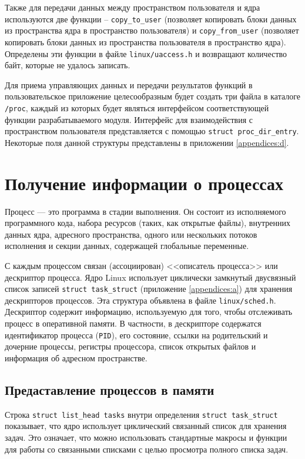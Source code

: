 Также для передачи данных между пространством пользователя и ядра используются две функции -- \texttt{copy\_to\_user} (позволяет копировать блоки данных из пространства ядра в пространство пользователя) и \texttt{copy\_from\_user} (позволяет копировать блоки данных из пространства пользователя в пространство ядра). Определены эти функции в файле \texttt{linux/uaccess.h} и возвращают количество байт, которые не удалось записать.

Для приема управляющих данных и передачи результатов функций в пользовательское приложение целесообразным будет создать три файла в каталоге \texttt{/proc}, каждый из которых будет являться интерфейсом соответствующей функции разрабатываемого модуля. Интерфейс для взаимодействия с пространством пользователя представляется с помощью \texttt{struct proc\_dir\_entry}. Некоторые поля данной структуры представлены в приложении \ref{appendices:d}. 


\section{Получение информации о процессах}

Процесс --- это программа в стадии выполнения. Он состоит из исполняемого программного кода, набора ресурсов (таких, как открытые файлы), внутренних данных ядра, адресного пространства, одного или нескольких потоков исполнения и секции данных, содержащей глобальные переменные. 

С каждым процессом связан (ассоциирован) <<описатель процесса>> или дескриптор процесса. Ядро Linux использует циклически замкнутый двусвязный список записей \texttt{struct task\_struct} (приложение \ref{appendices:a}) для хранения дескрипторов процессов. Эта структура объявлена в файле \texttt{linux/sched.h}. Дескриптор содержит информацию, используемую для того, чтобы отслеживать процесс в оперативной памяти. В частности, в дескрипторе содержатся идентификатор процесса (\texttt{PID}), его состояние, ссылки на родительский и дочерние процессы, регистры процессора, список открытых файлов и информация об адресном пространстве.


\subsection{Предаставление процессов в памяти}

Строка \texttt{struct list\_head tasks} внутри определения \texttt{struct task\_struct} показывает, что ядро использует циклический связанный список для хранения задач. Это означает, что можно использовать стандартные макросы и функции для работы со связанными списками с целью просмотра полного списка задач. 

